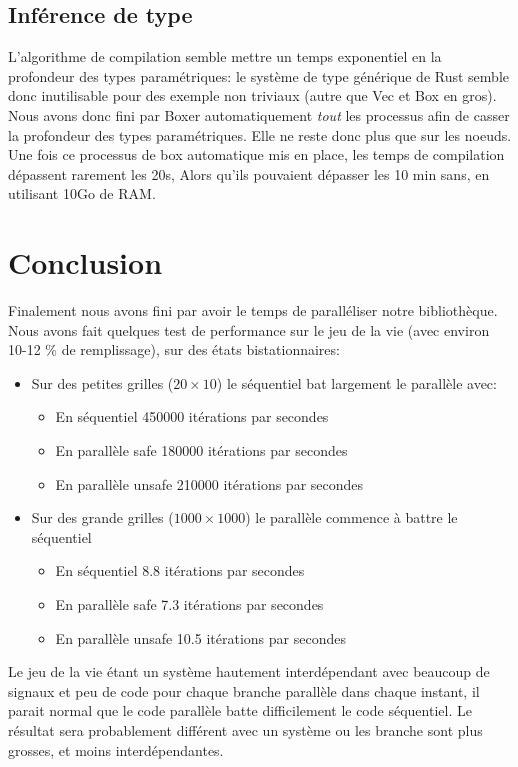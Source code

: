 \documentclass[a4paper]{article}
\renewcommand{\(}{\left(}
\renewcommand{\)}{\right)}
\begin{document}
\subsection{Inférence de type}
L'algorithme de compilation semble mettre un temps exponentiel en la profondeur
des types paramétriques: le système de type générique de Rust semble donc inutilisable
pour des exemple non triviaux (autre que Vec et Box en gros). Nous avons donc
fini par Boxer automatiquement \emph{tout} les processus afin de casser la
profondeur des types paramétriques. Elle ne reste donc plus que sur les noeuds.
Une fois ce processus de box automatique mis en place, les temps de compilation
dépassent rarement les 20s, Alors qu'ils pouvaient dépasser les 10 min sans, en
utilisant 10Go de RAM.

\section{Conclusion}
Finalement nous avons fini par avoir le temps de paralléliser notre
bibliothèque. Nous avons fait quelques test de performance sur le jeu de la vie
(avec environ 10-12 \% de remplissage), sur des états bistationnaires:

\begin{itemize}
\item Sur des petites grilles ($20 \times 10$) le séquentiel bat largement le
  parallèle avec:
  \begin{itemize}
  \item  En séquentiel 450000 itérations par secondes
  \item  En parallèle safe 180000 itérations par secondes
  \item  En parallèle unsafe 210000 itérations par secondes
  \end{itemize}
\item Sur des grande grilles ($1000 \times 1000$) le parallèle commence à battre le séquentiel
  \begin{itemize}
  \item  En séquentiel 8.8 itérations par secondes
  \item  En parallèle safe 7.3 itérations par secondes
  \item  En parallèle unsafe 10.5 itérations par secondes
  \end{itemize}
\end{itemize}

Le jeu de la vie étant un système hautement interdépendant avec beaucoup de
signaux et peu de code pour chaque branche parallèle dans chaque instant, il
parait normal que le code parallèle batte difficilement le code séquentiel. Le
résultat sera probablement différent avec un système ou les branche sont plus
grosses, et moins interdépendantes.
\end{document}
